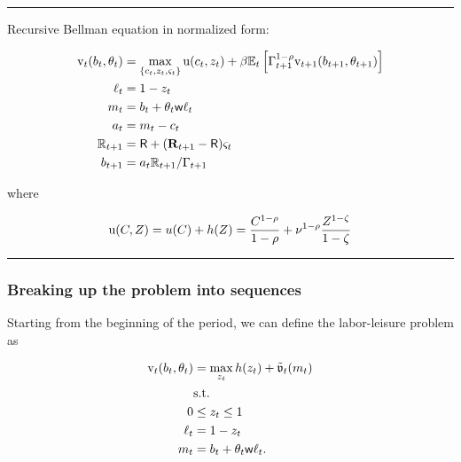 \documentclass[
  letterpaper,
  DIV=11,
  numbers=noendperiod]{scrartcl}
\begin{document}
\begin{center}\rule{0.5\linewidth}{0.5pt}\end{center}

Recursive Bellman equation in normalized form:

\[\begin{equation}
\begin{split}
    \mathrm{v}_{t}(b_{t}, \theta_{t}) & = \max_{\{c_{t},
      z_{t}, \varsigma_{t}\}} \mathrm{u}(c_{t}, z_{t}) +
    \beta \mathbb{E}_{t} \left[ \Gamma_{t+1}^{1-\rho}
      \mathrm{v}_{t+1} (b_{t+1},
      \theta_{t+1}) \right] \\
    \ell_{t} & = 1 - z_{t} \\
    m_{t} & = b_{t} + \theta_{t} \mathsf{w} \ell_{t} \\
    a_{t} & = m_{t} - c_{t} \\
    \mathbb{R}_{t+1} & = \mathsf{R} + (\mathbf{R}_{t+1} - \mathsf{R})
    \varsigma_{t} \\
    b_{t+1} & = a_{t} \mathbb{R}_{t+1} / \Gamma_{t+1}
  \end{split}
\end{equation}\]

where

\[\begin{equation}
  \mathrm{u}(C, Z) = u(C) + h(Z) = \frac{C^{1-\rho}}{1-\rho} + \nu^{1-\rho} \frac{Z^{1-\zeta}}{1-\zeta}
\end{equation}\]

\begin{center}\rule{0.5\linewidth}{0.5pt}\end{center}

\hypertarget{breaking-up-the-problem-into-sequences}{%
\subsubsection{Breaking up the problem into
sequences}\label{breaking-up-the-problem-into-sequences}}

Starting from the beginning of the period, we can define the
labor-leisure problem as

\[\begin{equation}
\begin{split}
    \mathrm{v}_{t}(b_{t}, \theta_{t}) & = \max_{ z_{t}}
    h(z_{t}) + \tilde{\mathfrak{v}}_{t} (m_{t}) \\
    & \text{s.t.} \\
    0 & \leq z_{t} \leq 1 \\
    \ell_{t} & = 1 - z_{t} \\
    m_{t} & = b_{t} + \theta_{t} \mathsf{w} \ell_{t}.
  \end{split}
\end{equation}\]
\end{document}
